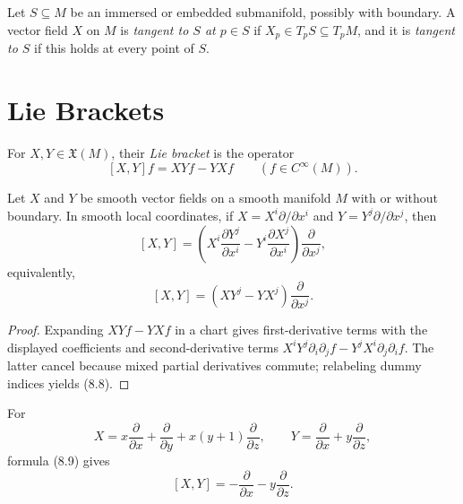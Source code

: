 \begin{definition}
\label{def:8-58-extra-1}
\leanok
Let $S\subseteq M$ be an immersed or embedded submanifold, possibly with
boundary. A vector field $X$ on $M$ is \emph{tangent to $S$ at $p\in S$} if
$X_p\in T_pS\subseteq T_pM$, and it is \emph{tangent to $S$} if this holds at
every point of $S$.
\end{definition}

\section{Lie Brackets}

\begin{definition}
\label{def:8-59-extra-1}
\mathlibok
For $X,Y\in\mathfrak{X}(M)$, their \emph{Lie bracket} is the operator
\[
[X,Y]f=XYf-YXf
\qquad (f\in C^\infty(M)).
\]
\end{definition}

\begin{proposition}
\label{prop:8-26}
\leanok
{}
Let $X$ and $Y$ be smooth vector fields on a smooth manifold $M$ with or
without boundary. In smooth local coordinates, if
$X=X^i\partial/\partial x^i$ and $Y=Y^j\partial/\partial x^j$, then
\[
[X,Y]=\left(X^i\frac{\partial Y^j}{\partial x^i}
-Y^i\frac{\partial X^j}{\partial x^i}\right)
\frac{\partial}{\partial x^j}, \tag{8.8}
\]
equivalently,
\[
[X,Y]=(XY^j-YX^j)\frac{\partial}{\partial x^j}. \tag{8.9}
\]
\end{proposition}

\begin{proof}
\leanok
\sketch Expanding $XYf-YXf$ in a chart gives first-derivative terms with the
displayed coefficients and second-derivative terms
$X^iY^j\partial_i\partial_jf-Y^jX^i\partial_j\partial_if$. The latter cancel
because mixed partial derivatives commute; relabeling dummy indices yields
(8.8).
\end{proof}

\begin{example}
\label{ex:8-27}
\leanok
{}
For
\[
X=x\frac{\partial}{\partial x}+\frac{\partial}{\partial y}
  +x(y+1)\frac{\partial}{\partial z},
\qquad
Y=\frac{\partial}{\partial x}+y\frac{\partial}{\partial z},
\]
formula (8.9) gives
\[
[X,Y]=-\frac{\partial}{\partial x}-y\frac{\partial}{\partial z}.
\]
\end{example}


